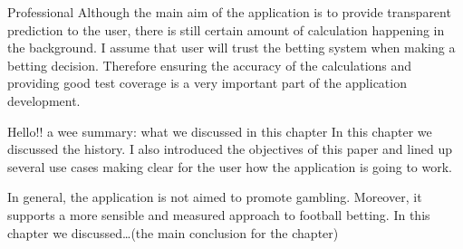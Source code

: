 Professional
Although the main aim of the application is to provide transparent prediction to the user, there is still certain amount of calculation happening in the background. I assume that user will trust the betting system when making a betting decision. Therefore ensuring the accuracy of the calculations and providing  good test coverage is a very important part of the application development.

Hello!!
a wee summary: what we discussed in this chapter
In this chapter we discussed the history. I also introduced the objectives of this paper and lined up several use cases making clear for the user how the application is going to work.

In general, the application is not aimed to promote gambling. Moreover, it supports a more sensible and measured approach to football betting.
In this chapter we discussed…(the main conclusion for the chapter)




